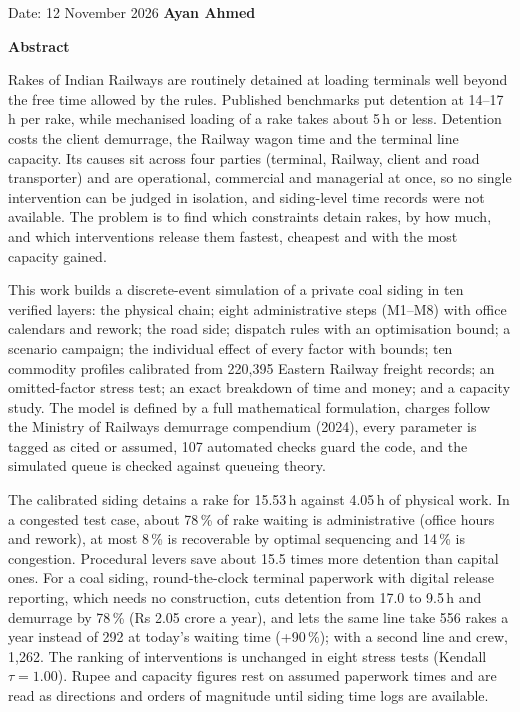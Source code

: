 \documentclass[12pt,a4paper]{report}
\begin{document}
\vspace{2em}
\noindent Date: 12 November 2026 \hfill \textbf{Ayan Ahmed}

\newpage
\thispagestyle{plain}
\null\vfil
\begin{center}\bfseries Abstract\end{center}
\noindent Rakes of Indian Railways are routinely detained at loading terminals well beyond the free time allowed by the rules. Published benchmarks put detention at 14--17\,h per rake, while mechanised loading of a rake takes about 5\,h or less. Detention costs the client demurrage, the Railway wagon time and the terminal line capacity. Its causes sit across four parties (terminal, Railway, client and road transporter) and are operational, commercial and managerial at once, so no single intervention can be judged in isolation, and siding-level time records were not available. The problem is to find which constraints detain rakes, by how much, and which interventions release them fastest, cheapest and with the most capacity gained.

This work builds a discrete-event simulation of a private coal siding in ten verified layers: the physical chain; eight administrative steps (M1--M8) with office calendars and rework; the road side; dispatch rules with an optimisation bound; a scenario campaign; the individual effect of every factor with bounds; ten commodity profiles calibrated from 220,395 Eastern Railway freight records; an omitted-factor stress test; an exact breakdown of time and money; and a capacity study. The model is defined by a full mathematical formulation, charges follow the Ministry of Railways demurrage compendium (2024), every parameter is tagged as cited or assumed, 107 automated checks guard the code, and the simulated queue is checked against queueing theory.

The calibrated siding detains a rake for 15.53\,h against 4.05\,h of physical work. In a congested test case, about 78\,\% of rake waiting is administrative (office hours and rework), at most 8\,\% is recoverable by optimal sequencing and 14\,\% is congestion. Procedural levers save about 15.5 times more detention than capital ones. For a coal siding, round-the-clock terminal paperwork with digital release reporting, which needs no construction, cuts detention from 17.0 to 9.5\,h and demurrage by 78\,\% (Rs 2.05 crore a year), and lets the same line take 556 rakes a year instead of 292 at today's waiting time (+90\,\%); with a second line and crew, 1,262. The ranking of interventions is unchanged in eight stress tests (Kendall $\tau = 1.00$). Rupee and capacity figures rest on assumed paperwork times and are read as directions and orders of magnitude until siding time logs are available.
\vfil\null
\end{document}
